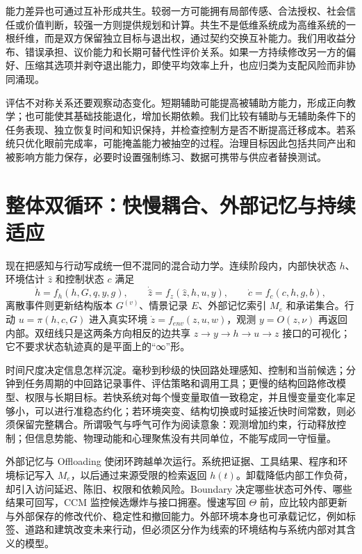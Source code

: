 能力差异也可通过互补形成共生。较弱一方可能拥有局部传感、合法授权、社会信任或价值判断，较强一方则提供规划和计算。共生不是低维系统成为高维系统的一根纤维，而是双方保留独立目标与退出权，通过契约交换互补能力。我们用收益分布、错误承担、议价能力和长期可替代性评价关系。如果一方持续修改另一方的偏好、压缩其选项并剥夺退出能力，即使平均效率上升，也应归类为支配风险而非协同涌现。

评估不对称关系还要观察动态变化。短期辅助可能提高被辅助方能力，形成正向教学；也可能使其基础技能退化，增加长期依赖。我们比较有辅助与无辅助条件下的任务表现、独立恢复时间和知识保持，并检查控制方是否不断提高迁移成本。若系统只优化眼前完成率，可能掩盖能力被抽空的过程。治理目标因此包括共同产出和被影响方能力保存，必要时设置强制练习、数据可携带与供应者替换测试。

\section{整体双循环：快慢耦合、外部记忆与持续适应}
\label{sec:section_2674}

现在把感知与行动写成统一但不混同的混合动力学。连续阶段内，内部快状态 $h$、环境估计 $\widehat z$ 和控制状态 $c$ 满足
\[
\dot h=f_h(h,G,q,y,g),\qquad
\dot{\widehat z}=f_z(\widehat z,h,u,y),\qquad
\dot c=f_c(c,h,g,b),
\]
离散事件则更新结构版本 $G^{(v)}$、情景记录 $E$、外部记忆索引 $M_e$ 和承诺集合。行动 $u=\pi(h,c,G)$ 进入真实环境 $\dot z=f_{env}(z,u,w)$，观测 $y=O(z,\nu)$ 再返回内部。双纽线只是这两条方向相反的边共享 $z\rightarrow y\rightarrow h\rightarrow u\rightarrow z$ 接口的可视化；它不要求状态轨迹真的是平面上的“∞”形。

时间尺度决定信息怎样沉淀。毫秒到秒级的快回路处理感知、控制和当前候选；分钟到任务周期的中回路记录事件、评估策略和调用工具；更慢的结构回路修改模型、权限与长期目标。若快系统对每个慢变量取值一致稳定，并且慢变量变化率足够小，可以进行准稳态约化；若环境突变、结构切换或时延接近快时间常数，则必须保留完整耦合。所谓吸气与呼气可作为阅读意象：观测增加约束，行动释放控制；但信息势能、物理动能和心理聚焦没有共同单位，不能写成同一守恒量。

外部记忆与 Offloading 使闭环跨越单次运行。系统把证据、工具结果、程序和环境标记写入 $M_e$，以后通过来源受限的检索返回 $h(t)$。卸载降低内部工作负荷，却引入访问延迟、陈旧、权限和依赖风险。Boundary 决定哪些状态可外传、哪些结果可回写，CCM 监控候选爆炸与接口拥塞。慢速写回 $\Theta$ 前，应比较内部更新与外部保存的修改代价、稳定性和撤回能力。外部环境本身也可承载记忆，例如标签、道路和建筑改变未来行动，但必须区分作为线索的环境结构与系统内部对其含义的模型。

